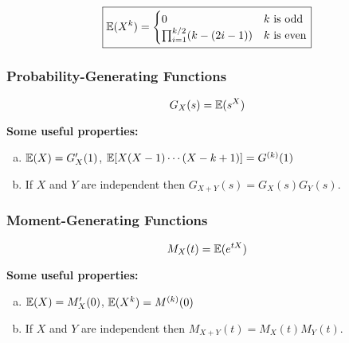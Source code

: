 \[
\boxed{
\E(X^k) = \begin{cases} 0& k \text{ is odd} \\
 \prod_{i=1}^{k/2} (k-(2i-1))  & k \text{ is even} \end{cases}}
\]



\subsubsection{Probability-Generating Functions}

\begin{definition}

\[
G_X(s) = \E(s^X) 
\]

\end{definition}

\begin{theorem} \textbf{Some useful properties:}

\begin{enumerate}[(a)]

\item \(\E(X) = G_X'(1)\), \(\E[X(X-1)\cdots(X - k +1)] = G^{(k)}(1)\)

\item If \(X\) and \(Y\) are independent then \(G_{X +Y}(s) = G_X(s) G_Y(s)\).

\end{enumerate}
\end{theorem}

\subsubsection{Moment-Generating Functions}

\begin{definition}

\[
M_X(t) = \E(e^{tX}) 
\]

\end{definition}

\begin{theorem} \textbf{Some useful properties:}

\begin{enumerate}[(a)]

\item \(\E(X) = M_X'(0)\), \(\E(X^k) = M^{(k)}(0)\)

\item If \(X\) and \(Y\) are independent then \(M_{X +Y}(t) = M_X(t) M_Y(t)\).

\end{enumerate}
\end{theorem}

